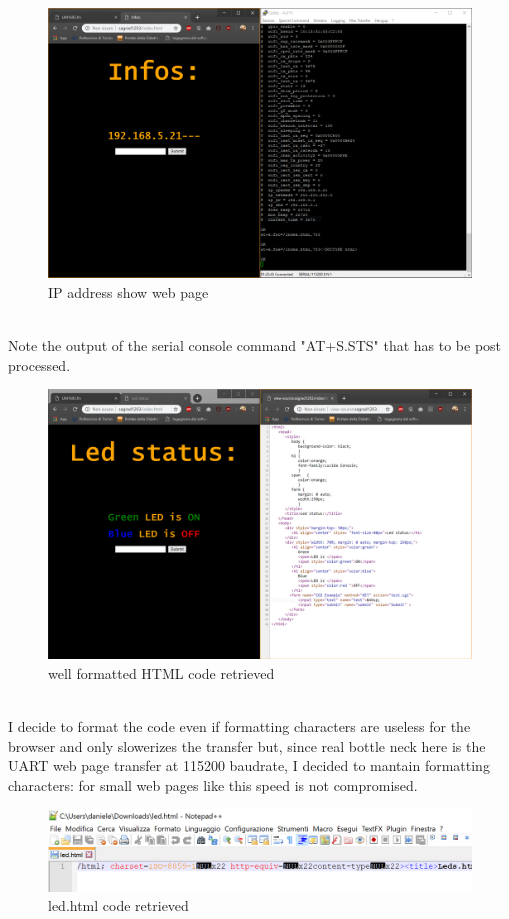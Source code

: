 \documentclass[peerreview]{IEEEtran}
\begin{document}
\begin{figure}[!ht]
\centering
\includegraphics[width=0.8\columnwidth]{4}
\caption{IP address show web page}
\label{fig_IP}
\end{figure}
\\Note the output of the serial console command "AT+S.STS" that has to be post processed.\\
\begin{figure}[!ht]
\centering
\includegraphics[width=0.8\columnwidth]{5}
\caption{well formatted HTML code retrieved}
\label{fig_HTML}
\end{figure}
\\I decide to format the code even if formatting characters are useless for the browser and only slowerizes the transfer but, since real bottle neck here is the UART web page transfer at 115200 baudrate, I decided to mantain formatting characters: for small web pages like this speed is not compromised.
\begin{figure}[!h]
\centering
\includegraphics[width=0.8\columnwidth]{8}
\caption{led.html code retrieved}
\label{fig_led}
\end{figure}
\end{document}
